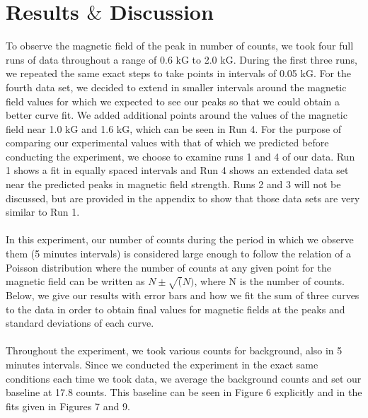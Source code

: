 \section{Results $\&$ Discussion}
To observe the magnetic field of the peak in number of counts, we took four full runs of data throughout a range of 0.6 kG to 2.0 kG. During the first three runs, we repeated the same exact steps to take points in intervals of 0.05 kG. For the fourth data set, we decided to extend in smaller intervals around the magnetic field values for which we expected to see our peaks so that we could obtain a better curve fit. We added additional points around the values of the magnetic field near 1.0 kG and 1.6 kG, which can be seen in Run 4. For the purpose of comparing our experimental values with that of which we predicted before conducting the experiment, we choose to examine runs 1 and 4 of our data. Run 1 shows a fit in equally spaced intervals and Run 4 shows an extended data set near the predicted peaks in magnetic field strength. Runs 2 and 3 will not be discussed, but are provided in the appendix to show that those data sets are very similar to Run 1. \\
\\
In this experiment, our number of counts during the period in which we observe them (5 minutes intervals) is considered large enough to follow the relation of a Poisson distribution where the number of counts at any given point for the magnetic field can be written as $N\pm \sqrt(N)$, where N is the number of counts. Below, we give our results with error bars and how we fit the sum of three curves to the data in order to obtain final values for magnetic fields at the peaks and standard deviations of each curve. \\
\\
Throughout the experiment, we took various counts for background, also in 5 minutes intervals. Since we conducted the experiment in the exact same conditions each time we took data, we average the background counts and set our baseline at 17.8 counts. This baseline can be seen in Figure 6 explicitly and in the fits given in Figures 7 and 9. 
